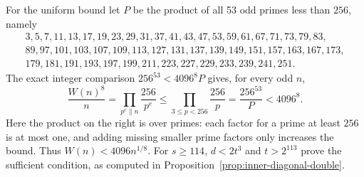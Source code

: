 \documentclass[11pt]{article}
\begin{document}
For the uniform bound let $P$ be the product of all 53 odd primes
less than $256$, namely
\[
\begin{gathered}
3,5,7,11,13,17,19,23,29,31,37,41,43,47,53,59,61,67,71,73,79,83,\\
89,97,101,103,107,109,113,127,131,137,139,149,151,157,163,167,173,\\
179,181,191,193,197,199,211,223,227,229,233,239,241,251.
\end{gathered}
\]
The exact integer comparison $256^{53}<4096^8P$ gives, for every
odd $n$,
\[
 \frac{W(n)^8}{n}
 =\prod_{p^e\parallel n}\frac{256}{p^e}
 \le\prod_{3\le p<256}\frac{256}{p}
 =\frac{256^{53}}{P}<4096^8.
\]
Here the product on the right is over primes: each factor for a
prime at least $256$ is at most one, and adding missing smaller
prime factors only increases the bound. Thus $W(n)<4096n^{1/8}$.
For $s\ge114$, $d<2t^3$ and $t>2^{113}$ prove the sufficient
condition, as computed in Proposition~\ref{prop:inner-diagonal-double}.
\end{document}
